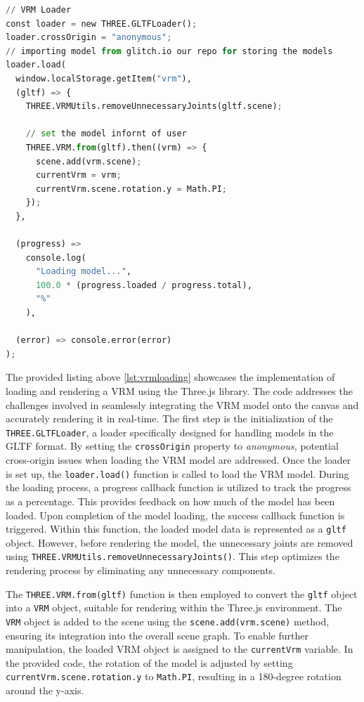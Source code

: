 \begin{lstlisting}[language=Python,caption=Loading the VRM onto the canvas,label=lst:vrmloading]
// VRM Loader
const loader = new THREE.GLTFLoader();
loader.crossOrigin = "anonymous";
// importing model from glitch.io our repo for storing the models
loader.load(
  window.localStorage.getItem("vrm"),
  (gltf) => {
    THREE.VRMUtils.removeUnnecessaryJoints(gltf.scene);

    // set the model infornt of user
    THREE.VRM.from(gltf).then((vrm) => {
      scene.add(vrm.scene);
      currentVrm = vrm;
      currentVrm.scene.rotation.y = Math.PI;
    });
  },

  (progress) =>
    console.log(
      "Loading model...",
      100.0 * (progress.loaded / progress.total),
      "%"
    ),

  (error) => console.error(error)
);
\end{lstlisting}


The provided listing above \ref{lst:vrmloading} showcases the implementation of loading and rendering a VRM using the Three.js library. 
The code addresses the challenges involved in seamlessly integrating the VRM model onto the canvas and accurately rendering it in real-time.
The first step is the initialization of the \texttt{THREE.GLTFLoader}, a loader specifically designed for handling models in the GLTF format. 
By setting the \texttt{crossOrigin} property to \emph{anonymous,} potential cross-origin issues when loading the VRM model are addressed.
Once the loader is set up, the \texttt{loader.load()} function is called to load the VRM model. During the loading process, 
a progress callback function is utilized to track the progress as a percentage. This provides feedback on how much of the model has been loaded.
Upon completion of the model loading, the success callback function is triggered. Within this function, 
the loaded model data is represented as a \texttt{gltf} object. However, before rendering the model, the unnecessary 
joints are removed using \texttt{THREE.VRMUtils.removeUnnecessaryJoints()}. This step optimizes the 
rendering process by eliminating any unnecessary components.

The \texttt{THREE.VRM.from(gltf)} function is then employed to convert the \texttt{gltf} object into a \texttt{VRM} object, 
suitable for rendering within the Three.js environment. The \texttt{VRM} object is added to the scene using 
the \texttt{scene.add(vrm.scene)} method, ensuring its integration into the overall scene graph.
To enable further manipulation, the loaded VRM object is assigned to the \texttt{currentVrm} variable. 
In the provided code, the rotation of the model is adjusted by setting \texttt{currentVrm.scene.rotation.y} to 
\texttt{Math.PI}, resulting in a 180-degree rotation around the y-axis.

